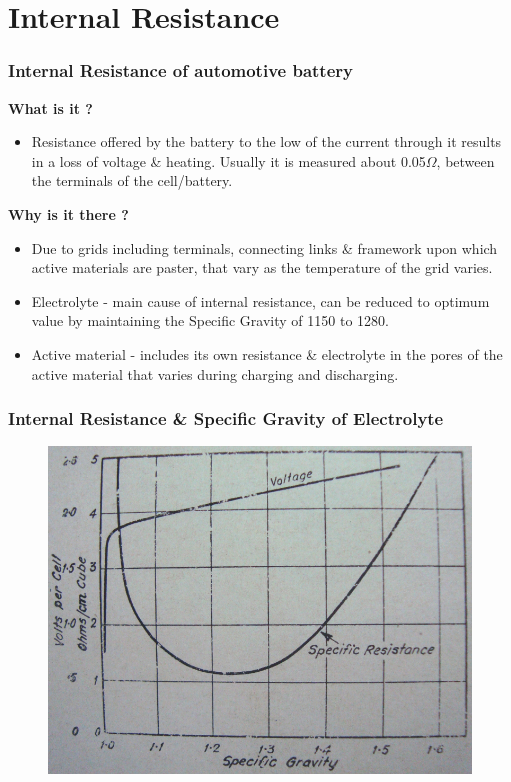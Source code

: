 \documentclass{beamer}
\begin{document}
\section{Internal Resistance}

\begin{frame}     %
  \frametitle{Internal Resistance of automotive battery}
  \fontsize{9pt}{14}\selectfont
  
  \textbf{What is it ?}
  \begin{itemize}
    \item Resistance offered by the battery to the low of the current through it results in a loss of voltage \& heating. Usually it is measured about
    0.05$\Omega$, between the terminals of the cell/battery.
  \end{itemize}
  
  \textbf{Why is it there ?}
  \begin{itemize}
    \item Due to grids including terminals, connecting links \& framework upon which active materials are paster, that vary as the temperature of the grid varies.
    \item Electrolyte - main cause of internal resistance, can be reduced to optimum value by maintaining the Specific Gravity of 1150 to 1280.
    \item Active material - includes its own resistance \& electrolyte in the pores of the active material that varies during charging and discharging.
  \end{itemize} 
\end{frame}

\begin{frame}     %
  \frametitle{Internal Resistance \& Specific Gravity of Electrolyte}
  
  \begin{figure}
    \includegraphics[width=0.8\linewidth]{./Resources/Images/specific_gravity_specific_resistance.png}
  \end{figure}
\end{frame}
\end{document}
